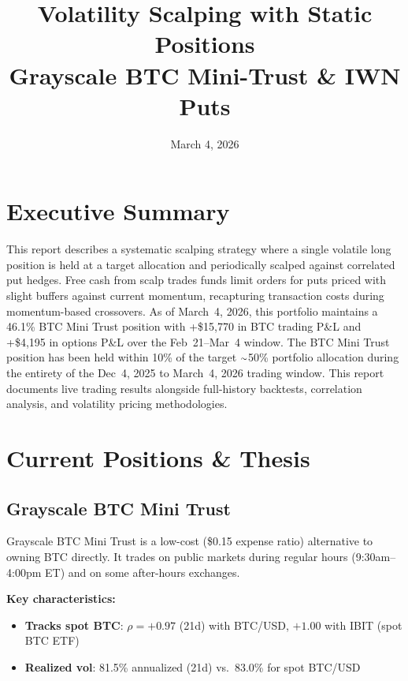 \documentclass[11pt,letterpaper]{article}
\title{%
  \textbf{Volatility Scalping with Static Positions} \\[4pt]
  \large Grayscale BTC Mini-Trust \& IWN Puts
}
\date{March 4, 2026}
\begin{document}
\maketitle
\thispagestyle{fancy}

\section{Executive Summary}

This report describes a systematic scalping strategy where a single volatile
long position is held at a target allocation and periodically scalped against
correlated put hedges. Free cash from scalp trades funds limit orders for puts
priced with slight buffers against current momentum, recapturing transaction
costs during momentum-based crossovers. As of March~4, 2026, this portfolio
maintains a 46.1\% BTC Mini Trust position with
\textcolor{gain}{+\$15,770} in BTC trading P\&L and
\textcolor{gain}{+\$4,195} in options P\&L over the Feb~21--Mar~4 window.
The BTC Mini Trust position has been held within 10\% of the target
${\raise.17ex\hbox{$\scriptstyle\sim$}}$50\% portfolio allocation during the
entirety of the Dec~4, 2025 to March~4, 2026 trading window. This report
documents live trading results alongside full-history backtests, correlation
analysis, and volatility pricing methodologies.

\section{Current Positions \& Thesis}

\subsection{Grayscale BTC Mini Trust}

Grayscale BTC Mini Trust is a low-cost (\$0.15 expense ratio) alternative to
owning BTC directly. It trades on public markets during regular hours
(9:30am--4:00pm ET) and on some after-hours exchanges.

\medskip
\noindent\textbf{Key characteristics:}

\begin{itemize}[itemsep=4pt]
  \item \textbf{Tracks spot BTC}: $\rho = +0.97$ (21d) with BTC/USD,
        $+1.00$ with IBIT (spot BTC ETF)
  \item \textbf{Realized vol}: 81.5\% annualized (21d) vs.\ 83.0\% for
        spot BTC/USD
\end{itemize}
\end{document}
